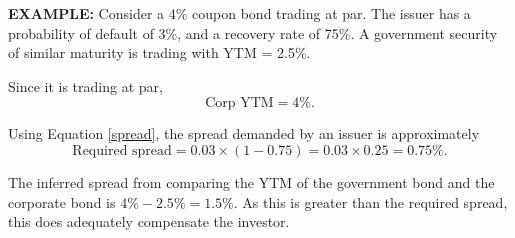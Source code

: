 \documentclass[../notes_compiled.tex]{subfiles}
\begin{document}
\begin{itemize}
{\color{RedViolet}
\item[] \textbf{EXAMPLE:} Consider a 4\% coupon bond trading at par. The issuer has a probability of default of 3\%, and a recovery rate of 75\%. A government security of similar maturity is trading with YTM = 2.5\%.
}


{\color{RoyalBlue}
Since it is trading at par,
\begin{equation*}
\text{Corp YTM} = 4\%.
\end{equation*}

Using Equation \ref{spread}, the spread demanded by an issuer is approximately
\begin{equation*}
\text{Required spread} = 0.03\times(1-0.75) = 0.03\times0.25 = 0.75\%.
\end{equation*}

The inferred spread from comparing the YTM of the government bond and the corporate bond is $4\%-2.5\%=1.5\%$. As this is greater than the required spread, this does adequately compensate the investor.
}
\end{itemize}
\end{document}
